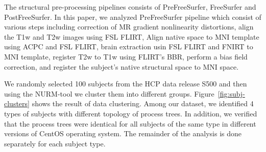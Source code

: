 \documentclass[a4paper,num-refs]{oup-contemporary}
\begin{document}
The structural pre-processing pipelines consists of PreFreeSurfer, 
FreeSurfer and PostFreeSurfer. In this paper, 
we analyzed PreFreeSurfer pipeline which consist of various steps 
including correction of MR 
gradient nonlinearity distortions, align the T1w and T2w images using 
FSL FLIRT, Align native space to MNI template using ACPC and FSL FLIRT, 
brain extraction usin FSL FLIRT and FNIRT to MNI template, register T2w 
to T1w using FLIRT's BBR, perform a bias field correction, and register 
the subject's native structural space to MNI space.  

We randomly selected 100 subjects from the HCP data release S500 and then 
using the NURM-tool we cluster them into different groups. 
Figure~\ref{fig:subj-clusters} shows the result of data clustering. 
Among our dataset, we identified 4 types of subjects with 
different topology of process trees. In addition, we verified that 
the process trees were identical for all subjects of the same type in 
different versions of CentOS operating system. The remainder of the 
analysis is done separately for each subject type.

\end{document}
